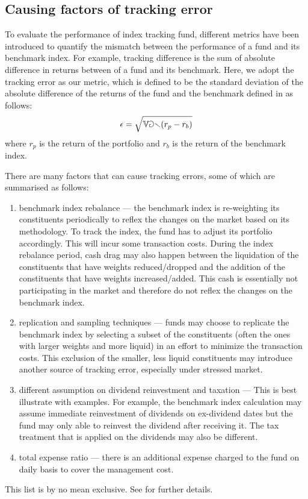 \subsection{Causing factors of tracking error}
To evaluate the performance of index tracking fund, different metrics have been introduced to quantify the mismatch between the performance of a fund and its benchmark index. For example, tracking difference is the sum of absolute difference in returns between of a fund and its benchmark. Here, we adopt the tracking error as our metric, which is defined to be the standard deviation of the absolute difference of the returns of the fund and the benchmark defined in \cite{BJ13} as follows:
\begin{equation}
  \epsilon = \sqrt{\operatorname{\mathbb{Var}}(r_p - r_b)}
\end{equation}
where $r_p$ is the return of the portfolio and $r_b$ is the return of the benchmark index.
 
There are many factors that can cause tracking errors, some of which are summarised as follows:
\begin{enumerate}
\item benchmark index rebalance --- the benchmark index is re-weighting its constituents periodically to reflex the changes on the market based on its methodology. To track the index, the fund has to adjust its portfolio accordingly. This will incur some transaction costs. During the index rebalance period, cash drag may also  happen between the liquidation of the constituents that have weights reduced/dropped and the addition of the constituents that have weights increased/added. This cash is essentially not participating in the market and therefore do not reflex the changes on the benchmark index.
\item replication and sampling techniques --- funds may choose to replicate the benchmark index by selecting a subset of the constituents (often the ones with larger weights and more liquid) in an effort to minimize the transaction costs. This exclusion of the smaller, less liquid constituents may introduce another source of tracking error, especially under stressed market.
\item different assumption on dividend reinvestment and taxation --- This is best illustrate with examples. For example, the benchmark index calculation may assume immediate reinvestment of dividends on ex-dividend dates but the fund may only able to reinvest the dividend after receiving it. The tax treatment that is applied on the dividends may also be different.
\item total expense ratio --- there is an additional expense charged to the fund on daily basis to cover the management cost.
\end{enumerate}
This list is by no mean exclusive. See \cite{BJ13} for further details.
 
